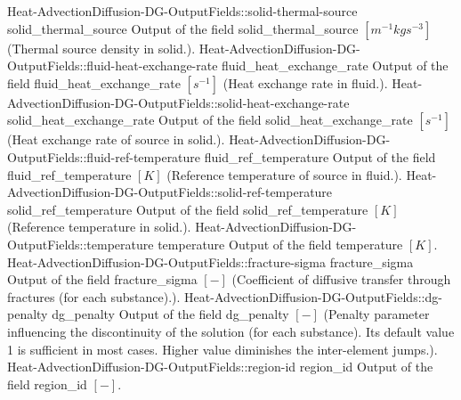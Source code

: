 \begin{SelectionType}
		\SelectionItem
			{Heat-AdvectionDiffusion-DG-OutputFields::solid-thermal-source}
			{solid{\_}thermal{\_}source}
			{{{Output of the field solid{\_}thermal{\_}source }{$[m^{-1}kgs^{-3}]$}{ (Thermal source density in solid.).}}}
		\SelectionItem
			{Heat-AdvectionDiffusion-DG-OutputFields::fluid-heat-exchange-rate}
			{fluid{\_}heat{\_}exchange{\_}rate}
			{{{Output of the field fluid{\_}heat{\_}exchange{\_}rate }{$[s^{-1}]$}{ (Heat exchange rate in fluid.).}}}
		\SelectionItem
			{Heat-AdvectionDiffusion-DG-OutputFields::solid-heat-exchange-rate}
			{solid{\_}heat{\_}exchange{\_}rate}
			{{{Output of the field solid{\_}heat{\_}exchange{\_}rate }{$[s^{-1}]$}{ (Heat exchange rate of source in solid.).}}}
		\SelectionItem
			{Heat-AdvectionDiffusion-DG-OutputFields::fluid-ref-temperature}
			{fluid{\_}ref{\_}temperature}
			{{{Output of the field fluid{\_}ref{\_}temperature }{$[K]$}{ (Reference temperature of source in fluid.).}}}
		\SelectionItem
			{Heat-AdvectionDiffusion-DG-OutputFields::solid-ref-temperature}
			{solid{\_}ref{\_}temperature}
			{{{Output of the field solid{\_}ref{\_}temperature }{$[K]$}{ (Reference temperature in solid.).}}}
		\SelectionItem
			{Heat-AdvectionDiffusion-DG-OutputFields::temperature}
			{temperature}
			{{{Output of the field temperature }{$[K]$}{.}}}
		\SelectionItem
			{Heat-AdvectionDiffusion-DG-OutputFields::fracture-sigma}
			{fracture{\_}sigma}
			{{{Output of the field fracture{\_}sigma }{$[-]$}{ (Coefficient of diffusive transfer through fractures (for each substance).).}}}
		\SelectionItem
			{Heat-AdvectionDiffusion-DG-OutputFields::dg-penalty}
			{dg{\_}penalty}
			{{{Output of the field dg{\_}penalty }{$[-]$}{ (Penalty parameter influencing the discontinuity of the solution (for each substance). Its default value 1 is sufficient in most cases. Higher value diminishes the inter-element jumps.).}}}
		\SelectionItem
			{Heat-AdvectionDiffusion-DG-OutputFields::region-id}
			{region{\_}id}
			{{{Output of the field region{\_}id }{$[-]$}{.}}}
\end{SelectionType}
